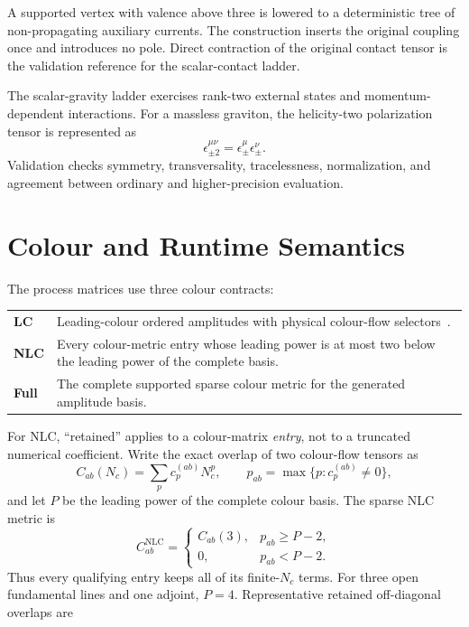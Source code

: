 \documentclass[10pt,letterpaper]{article}
\begin{document}
A supported vertex with valence above three is lowered to a deterministic tree
of non-propagating auxiliary currents. The construction inserts the original
coupling once and introduces no pole. Direct contraction of the original
contact tensor is the validation reference for the scalar-contact ladder.

The scalar-gravity ladder exercises rank-two external states and
momentum-dependent interactions. For a massless graviton, the helicity-two
polarization tensor is represented as
\begin{equation}
  \epsilon^{\mu\nu}_{\pm 2}
  = \epsilon^{\mu}_{\pm}\epsilon^{\nu}_{\pm} .
\end{equation}
Validation checks symmetry, transversality, tracelessness, normalization, and
agreement between ordinary and higher-precision evaluation.

\section{Colour and Runtime Semantics}

The process matrices use three colour contracts:
\begin{center}
\begin{tabular}{@{}L{0.45in}L{5.85in}@{}}
\textbf{LC} & Leading-colour ordered amplitudes with physical colour-flow selectors~\cite{Maltoni2002}. \\
\textbf{NLC} & Every colour-metric entry whose leading power is at most two below the leading power of the complete basis. \\
\textbf{Full} & The complete supported sparse colour metric for the generated amplitude basis. \\
\end{tabular}
\end{center}

For NLC, ``retained'' applies to a colour-matrix \emph{entry}, not to a
truncated numerical coefficient.  Write the exact overlap of two colour-flow
tensors as
\begin{equation}
  C_{ab}(N_c)=\sum_p c^{(ab)}_p N_c^p,
  \qquad
  p_{ab}=\max\{p:c^{(ab)}_p\ne0\},
  \label{eq:nlc-entry-gate}
\end{equation}
and let \(P\) be the leading power of the complete colour basis.  The sparse
NLC metric is
\begin{equation}
  C^{\mathrm{NLC}}_{ab}=
  \begin{cases}
    C_{ab}(3), & p_{ab}\ge P-2,\\
    0,         & p_{ab}<P-2.
  \end{cases}
  \label{eq:nlc-exact-coefficient}
\end{equation}
Thus every qualifying entry keeps all of its finite-\(N_c\) terms.  For three
open fundamental lines and one adjoint, \(P=4\).  Representative retained
off-diagonal overlaps are
\end{document}
